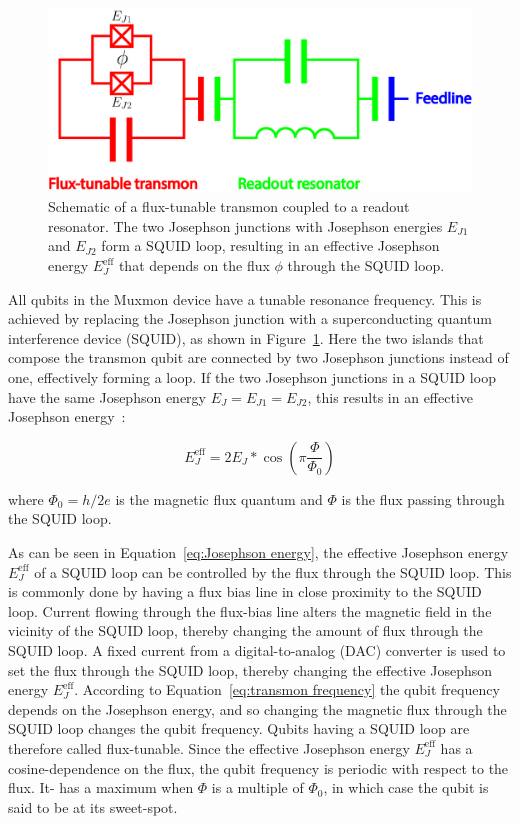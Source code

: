         \begin{figure}[tb]
          \centering
          \includegraphics[width=.7\textwidth]{../Figures/Qubit characterization/flux-tunable transmon schematic joined.jpg}
          \caption{Schematic of a flux-tunable transmon coupled to a readout resonator. The two Josephson junctions with Josephson energies $E_{J1}$ and $E_{J2}$ form a SQUID loop, resulting in an effective Josephson energy $E_J^\text{eff}$ that depends on the flux $\phi$ through the SQUID loop.}
          \label{fig:flux-tunable transmon schematic}
        \end{figure}
        All qubits in the Muxmon device have a tunable resonance frequency. This is achieved by replacing the Josephson junction with a superconducting quantum interference device (SQUID), as shown in Figure~\ref{fig:flux-tunable transmon schematic}. Here the two islands that compose the transmon qubit are connected by two Josephson junctions instead of one, effectively forming a loop. If the two Josephson junctions in a SQUID loop have the same Josephson energy $E_J=E_{J1}=E_{J2}$, this results in an effective Josephson energy~\cite[pp.54-56]{Reed}:

        \begin{equation}
          E_J^\text{eff}=2E_J*\cos{\left( \pi \frac{\Phi}{\Phi_0} \right)}
          \label{eq:Josephson energy}
        \end{equation}

        where $\Phi_0=h/2e$ is the magnetic flux quantum and $\Phi$ is the flux passing through the SQUID loop.

        As can be seen in Equation~\ref{eq:Josephson energy}, the effective Josephson energy $E_J^\text{eff}$ of a SQUID loop can be controlled by the flux through the SQUID loop. This is commonly done by having a flux bias line in close proximity to the SQUID loop. Current flowing through the flux-bias line alters the magnetic field in the vicinity of the SQUID loop, thereby changing the amount of flux through the SQUID loop. A fixed current from a digital-to-analog (DAC) converter is used to set the flux through the SQUID loop, thereby changing the effective Josephson energy $E_J^\text{eff}$. According to Equation~\ref{eq:transmon frequency} the qubit frequency depends on the Josephson energy, and so changing the magnetic flux through the SQUID loop changes the qubit frequency. Qubits having a SQUID loop are therefore called flux-tunable. Since the effective Josephson energy $E_J^\text{eff}$ has a cosine-dependence on the flux, the qubit frequency is periodic with respect to the flux. It- has a maximum when $\Phi$ is a multiple of $\Phi_0$, in which case the qubit is said to be at its sweet-spot.

